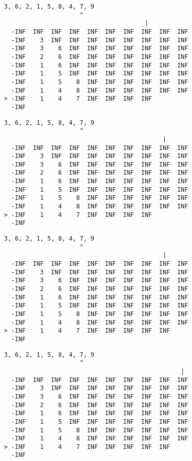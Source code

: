{ \begin{verbatim}
3, 6, 2, 1, 5, 8, 4, 7, 9
                     ^
                                       |
  -INF  INF  INF  INF  INF  INF  INF  INF  INF  INF
  -INF    3  INF  INF  INF  INF  INF  INF  INF  INF
  -INF    3    6  INF  INF  INF  INF  INF  INF  INF
  -INF    2    6  INF  INF  INF  INF  INF  INF  INF
  -INF    1    6  INF  INF  INF  INF  INF  INF  INF
  -INF    1    5  INF  INF  INF  INF  INF  INF  INF
  -INF    1    5    8  INF  INF  INF  INF  INF  INF
  -INF    1    4    8  INF  INF  INF  INF  INF  INF
> -INF    1    4    7  INF  INF  INF  INF          
  -INF                                             
\end{verbatim} }

{ \begin{verbatim}
3, 6, 2, 1, 5, 8, 4, 7, 9
                     ^
                                            |
  -INF  INF  INF  INF  INF  INF  INF  INF  INF  INF
  -INF    3  INF  INF  INF  INF  INF  INF  INF  INF
  -INF    3    6  INF  INF  INF  INF  INF  INF  INF
  -INF    2    6  INF  INF  INF  INF  INF  INF  INF
  -INF    1    6  INF  INF  INF  INF  INF  INF  INF
  -INF    1    5  INF  INF  INF  INF  INF  INF  INF
  -INF    1    5    8  INF  INF  INF  INF  INF  INF
  -INF    1    4    8  INF  INF  INF  INF  INF  INF
> -INF    1    4    7  INF  INF  INF  INF          
  -INF                                             
\end{verbatim} }

{ \begin{verbatim}
3, 6, 2, 1, 5, 8, 4, 7, 9
                     ^
                                            |
  -INF  INF  INF  INF  INF  INF  INF  INF  INF  INF
  -INF    3  INF  INF  INF  INF  INF  INF  INF  INF
  -INF    3    6  INF  INF  INF  INF  INF  INF  INF
  -INF    2    6  INF  INF  INF  INF  INF  INF  INF
  -INF    1    6  INF  INF  INF  INF  INF  INF  INF
  -INF    1    5  INF  INF  INF  INF  INF  INF  INF
  -INF    1    5    8  INF  INF  INF  INF  INF  INF
  -INF    1    4    8  INF  INF  INF  INF  INF  INF
> -INF    1    4    7  INF  INF  INF  INF  INF     
  -INF                                             
\end{verbatim} }

{ \begin{verbatim}
3, 6, 2, 1, 5, 8, 4, 7, 9
                     ^
                                                 |
  -INF  INF  INF  INF  INF  INF  INF  INF  INF  INF
  -INF    3  INF  INF  INF  INF  INF  INF  INF  INF
  -INF    3    6  INF  INF  INF  INF  INF  INF  INF
  -INF    2    6  INF  INF  INF  INF  INF  INF  INF
  -INF    1    6  INF  INF  INF  INF  INF  INF  INF
  -INF    1    5  INF  INF  INF  INF  INF  INF  INF
  -INF    1    5    8  INF  INF  INF  INF  INF  INF
  -INF    1    4    8  INF  INF  INF  INF  INF  INF
> -INF    1    4    7  INF  INF  INF  INF  INF     
  -INF                                             
\end{verbatim} }


